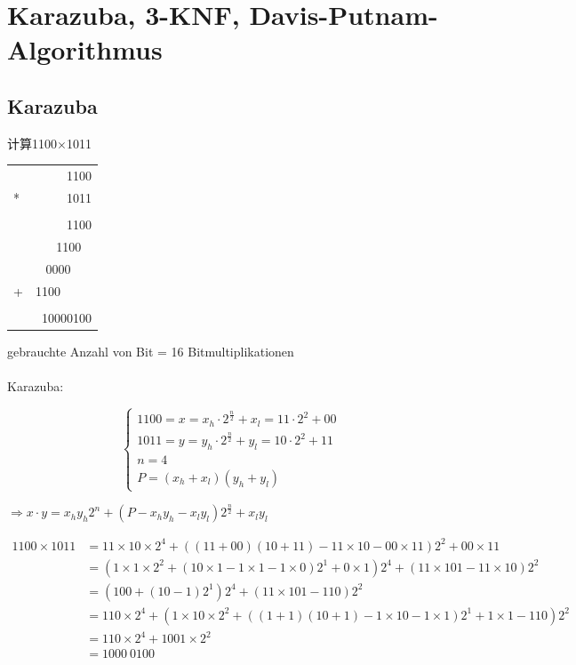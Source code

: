 \documentclass[a4paper]{article}    %
\begin{document}
\section{Karazuba, 3-KNF, Davis-Putnam-Algorithmus}

\subsection{Karazuba}

\noindent 计算1100$\times$1011

\begin{tabular}{lr}
    &1100\\
    *&1011\\
    \hline\\
    &1100\\
    &1100 \ \! \\
    &0000 \ \! \ \! \\
    +&1100 \ \! \ \! \ \! \\
    \hline\\
    &10000100
\end{tabular}

gebrauchte Anzahl von Bit = 16 Bitmultiplikationen
\\
\\
Karazuba:

\begin{equation}
    \left\{
        \begin{array}{lr}
            1100 = x = x_h\cdot 2^{\frac{n}{2}} + x_l = 11\cdot 2^2 + 00\\
            1011 = y = y_h\cdot 2^{\frac{n}{2}} +y_l = 10\cdot 2^2 +11\\
            n = 4 \\
            P = (x_h + x_l)(y_h + y_l)
        \end{array}
    \right.
\end{equation}

$\Rightarrow x \cdot y = x_hy_h2^n+(P-x_hy_h-x_ly_l)2^{\frac{n}{2}} +x_ly_l$


\begin{equation}
    \begin{split}
        1100\times 1011 & = 11\times 10\times 2^4 + ((11+00)(10+11)-11\times 10 - 00\times 11)2^2+00\times 11 \\
        & = (1 \times 1 \times 2^2 + (10\times 1 - 1\times 1 - 1\times 0)2^1 + 0\times 1)2^4+(11\times 101 - 11\times 10)2^2 \\
        & = (100+(10-1)2^1)2^4 +(11\times 101 - 110)2^2 \\ 
        & = 110\times 2^4 + (1\times 10\times 2^2 + ((1+1)(10+1)-1\times 10 - 1\times 1)2^1 + 1\times 1 - 110)2^2\\
        & = 110\times 2^4 +1001\times 2^2\\
        & = 1000 \ 0100
    \end{split}
\end{equation}
\end{document}
